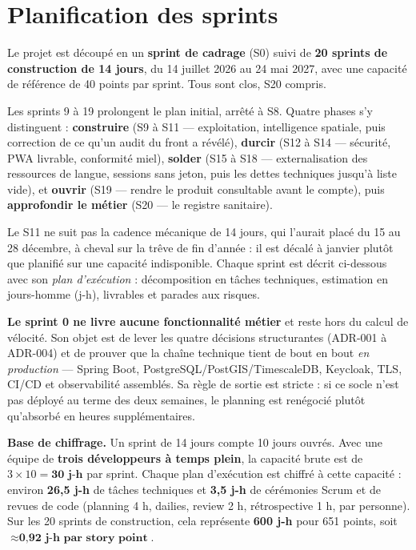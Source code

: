 \chapter{Planification des sprints}
\label{chap:sprints}

Le projet est découpé en un \textbf{sprint de cadrage} (S0) suivi de
\textbf{20 sprints de construction de 14 jours}, du 14 juillet 2026 au
24 mai 2027, avec une capacité de référence de 40 points par sprint. Tous sont
clos, S20 compris.

Les sprints 9 à 19 prolongent le plan initial, arrêté à S8. Quatre phases s'y
distinguent : \textbf{construire} (S9 à S11 --- exploitation, intelligence
spatiale, puis correction de ce qu'un audit du front a révélé),
\textbf{durcir} (S12 à S14 --- sécurité, PWA livrable, conformité miel),
\textbf{solder} (S15 à S18 --- externalisation des ressources de langue,
sessions sans jeton, puis les dettes techniques jusqu'à liste vide), et
\textbf{ouvrir} (S19 --- rendre le produit consultable avant le compte), puis
\textbf{approfondir le métier} (S20 --- le registre sanitaire).

Le S11 ne suit pas la cadence mécanique de 14 jours, qui l'aurait placé du 15
au 28 décembre, à cheval sur la trêve de fin d'année : il est décalé à janvier
plutôt que planifié sur une capacité indisponible. Chaque sprint est décrit ci-dessous avec son
\emph{plan d'exécution} : décomposition en tâches techniques, estimation en
jours-homme (j-h), livrables et parades aux risques.

\begin{encadre}
\textbf{Le sprint 0 ne livre aucune fonctionnalité métier} et reste hors du
calcul de vélocité. Son objet est de lever les quatre décisions structurantes
(ADR-001 à ADR-004) et de prouver que la chaîne technique tient de bout en bout
\emph{en production} --- Spring Boot, PostgreSQL/PostGIS/TimescaleDB, Keycloak,
TLS, CI/CD et observabilité assemblés. Sa règle de sortie est stricte : si ce
socle n'est pas déployé au terme des deux semaines, le planning est
renégocié plutôt qu'absorbé en heures supplémentaires.
\end{encadre}

\begin{encadre}
\textbf{Base de chiffrage.} Un sprint de 14 jours compte 10 jours ouvrés.
Avec une équipe de \textbf{trois développeurs à temps plein}, la capacité
brute est de $3 \times 10 = \textbf{30 j-h}$ par sprint. Chaque plan
d'exécution est chiffré à cette capacité : environ \textbf{26,5 j-h} de
tâches techniques et \textbf{3,5 j-h} de cérémonies Scrum et de revues de
code (planning 4 h, dailies, review 2 h, rétrospective 1 h, par personne).
Sur les 20 sprints de construction, cela représente \textbf{600 j-h} pour
651 points, soit $\approx \textbf{0,92 j-h par story point}$.
\end{encadre}

